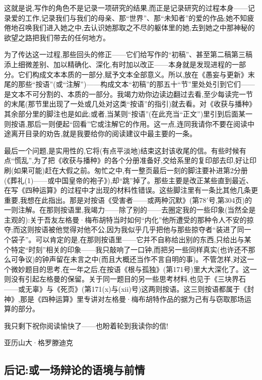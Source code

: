 这就是说,写作的角色不是记录一项研究的结果,而正是记录研究的过程本身——记录爱的工作,记录我们与我们的母亲、那“世界”、那“未知者”的爱的作品;她不知疲倦地召唤我们进入她之中,去认识她那取之不尽的躯体里的她,去到她之中那神秘的欲望之路把我们带去的任何地方。

为了传达这一过程,那些回头的修正——它们给写作的“初稿”、甚至第二稿第三稿添上细微差别、加以精确化、深化,有时加以改正——本身就是发现进程的一部分。它们构成文本本质的一部分,赋予文本全部意义。所以,放在《愚妄与更新》末尾的那些“按语”(或“注解”)——构成文本“初稿”的那五十“节”里处处引到它们——是文本不可分割的、本质的一部分。我竭力劝你边读边翻过去看,至少每读完一节的末尾(那节里出现了一处或几处对这类“按语”的指引)就去看。对《收获与播种》其余部分里的脚注也是如此;或者,当某则“按语”(在此充当“正文”)里引到后面某一则按语,那后一则便起“回看”它或注解它的作用。这一点,连同我请你不要在阅读中途离开目录的劝告,就是我要给你的阅读建议中最主要的一条。

最后一个问题,是实用性的,它将(有点平淡地)结束这封该收尾的信。有些时候有点“慌乱”,为了把《收获与播种》的各个分册准备好,交给系里的复印部去印,好让印刷(如果可能)赶在大假之前。匆忙之中,有一整页最后一刻的脚注要补进第2分册(《葬礼(1)——或中国皇帝的袍子》),却“跳”掉了。那些主要是改正某些直到最近、在写《四种运算》的过程中才出现的材料性错误。这些脚注里有一条比其他几条更重要,我想在此指出。那是对按语《受害者——或两种沉默》(第78$'$号,第304页)的一则注解。在那则按语里,我竭力——除了别的——去圈定我的一些印象(当然全是主观的):关于吾友左格曼·梅布胡特当时如何“内化”他所遭受的那种令人不安的掠夺;而这则按语被他觉得对他不公,因为我似乎几乎把他与那些掠夺者“装进了同一个袋子”。可以肯定的是,在那则按语里——它并不自称给出别的东西,只给出与某个特定“时刻”相关的印象——我只敲响了一口钟,而把另一些同样真实(也许还不那么可争议)的钟声留在未言之中(而且大概还当作不言自明的事)。不管怎样,对这一个微妙题目的思考,在一年之后,在按语《根与孤独》(第171号)里大大深化了。这一则没有引起左格曼的保留。关于同一题目的另一些思考材料,也见于《三块界石——或无辜》与《死页》(第171(x)与(xii)号)这两则按语。这三则按语都属于《封神》,那是《四种运算》里专讲对左格曼·梅布胡特作品的据为己有与窃取那场运算的部分。

我只剩下祝你阅读愉快了——也盼着轮到我读你的信!

亚历山大·格罗滕迪克

\subsection*{后记:或一场辩论的语境与前情}

